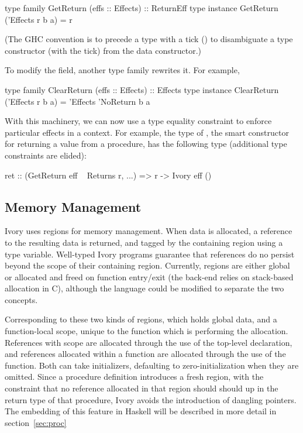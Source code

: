 \begin{code}
type family   GetReturn (effs :: Effects) :: ReturnEff
type instance GetReturn ('Effects r b a) = r
\end{code}

\noindent
(The GHC convention is to precede a type with a tick () to disambiguate a
type constructor (with the tick) from the data constructor.)

To modify the field, another type family rewrites it. For example,

\begin{code}
type family   ClearReturn (effs :: Effects) :: Effects
type instance ClearReturn ('Effects r b a) =
  'Effects 'NoReturn b a
\end{code}

With this machinery, we can now use a type equality constraint to enforce
particular effects in a context. For example, the type of , the smart
constructor for returning a value from a procedure, has the following type
(additional type constraints are elided):

\begin{code}
ret :: (GetReturn eff ~ Returns r, ...)
    => r -> Ivory eff ()
\end{code}

\subsection{Memory Management}
\label{sec:ref}

Ivory uses regions for memory management.  When data is allocated, a reference
to the resulting data is returned, and tagged by the containing region using a
type variable.  Well-typed Ivory programs guarantee that references do no
persist beyond the scope of their containing region.  Currently, regions are
either global or allocated and freed on function entry/exit (the back-end relies
on stack-based allocation in C), although the language could be modified to
separate the two concepts.


Corresponding to these two kinds of regions,  which holds global data, and a
function-local scope, unique to the function which is performing the allocation.
References with  scope are allocated through the use of the 
top-level declaration, and references allocated within a function are allocated
through the use of the  function.  Both can take initializers,
defaulting to zero-initialization when they are omitted.  Since a procedure
definition introduces a fresh region, with the constraint that no reference
allocated in that region should should up in the return type of that procedure,
Ivory avoids the introduction of dangling pointers.  The embedding of this
feature in Haskell will be described in more detail in section~\ref{sec:proc}

